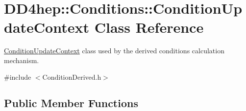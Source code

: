 \hypertarget{class_d_d4hep_1_1_conditions_1_1_condition_update_context}{
\section{DD4hep::Conditions::ConditionUpdateContext Class Reference}
\label{class_d_d4hep_1_1_conditions_1_1_condition_update_context}
}


\hyperlink{class_d_d4hep_1_1_conditions_1_1_condition_update_context}{ConditionUpdateContext} class used by the derived conditions calculation mechanism.  


{\ttfamily \#include $<$ConditionDerived.h$>$}\subsection*{Public Member Functions}
